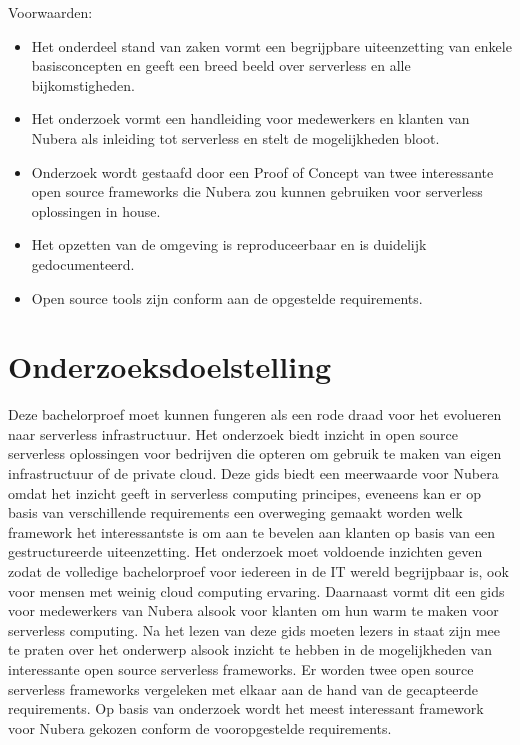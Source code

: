 Voorwaarden: 
\begin{itemize}
    \item Het onderdeel stand van zaken vormt een begrijpbare uiteenzetting van enkele basisconcepten en geeft een breed beeld over serverless en alle bijkomstigheden.
    \item Het onderzoek vormt een handleiding voor medewerkers en klanten van Nubera als inleiding tot serverless en stelt de mogelijkheden bloot.
    \item Onderzoek wordt gestaafd door een Proof of Concept van twee interessante open source frameworks die Nubera zou kunnen gebruiken voor serverless oplossingen in house.
    \item Het opzetten van de omgeving is reproduceerbaar en is duidelijk gedocumenteerd.
    \item Open source tools zijn conform aan de opgestelde requirements.
\end{itemize}



\section{Onderzoeksdoelstelling}
\label{sec:onderzoeksdoelstelling}

Deze bachelorproef moet kunnen fungeren als een rode draad voor het evolueren naar serverless infrastructuur. Het onderzoek biedt inzicht in open source serverless oplossingen voor bedrijven die opteren om gebruik te maken van eigen infrastructuur of de private cloud. Deze gids biedt een meerwaarde voor Nubera omdat het inzicht geeft in serverless computing principes, eveneens kan er op basis van verschillende requirements een overweging gemaakt worden welk framework het interessantste is om aan te bevelen aan klanten op basis van een gestructureerde uiteenzetting. Het onderzoek moet voldoende inzichten geven zodat de volledige bachelorproef voor iedereen in de IT wereld begrijpbaar is, ook voor mensen met weinig cloud computing ervaring. Daarnaast vormt dit een gids voor medewerkers van Nubera alsook voor klanten om hun warm te maken voor serverless computing. Na het lezen van deze gids moeten lezers in staat zijn mee te praten over het onderwerp alsook inzicht te hebben in de mogelijkheden van interessante open source serverless frameworks. Er worden twee open source serverless frameworks vergeleken met elkaar aan de hand van de gecapteerde requirements. Op basis van onderzoek wordt het meest interessant framework voor Nubera gekozen conform de vooropgestelde requirements.


